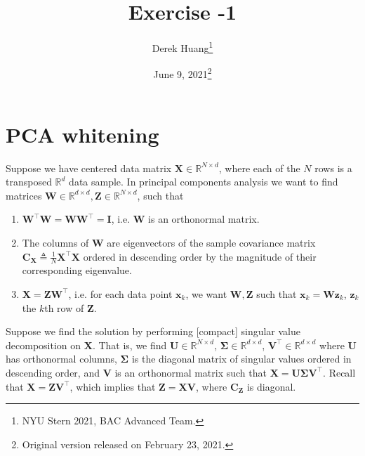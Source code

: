 \documentclass{article}
\title{Exercise -1}
\author{Derek Huang\thanks{NYU Stern 2021, BAC Advanced Team.}}
\date{June 9, 2021\thanks{Original version released on February 23, 2021.}}
\numberwithin{equation}{section}
\begin{document}
\maketitle
\thispagestyle{fancy}

\vspace{-20 pt}

\section{PCA whitening}

Suppose we have centered data matrix $ \mathbf{X} \in
\mathbb{R}^{N \times d} $, where each of the $ N $ rows is a transposed
$ \mathbb{R}^d $ data sample. In principal components analysis we want to find
matrices $ \mathbf{W} \in \mathbb{R}^{d \times d},
\mathbf{Z} \in \mathbb{R}^{N \times d} $, such that
\begin{enumerate}
    \item
    $ \mathbf{W}^\top\mathbf{W} = \mathbf{WW}^\top = \mathbf{I} $, i.e.
    $ \mathbf{W} $ is an orthonormal matrix.

    \item
    The columns of $ \mathbf{W} $ are eigenvectors of the sample covariance
    matrix $ \mathbf{C}_\mathbf{X} \triangleq \frac{1}{N}
    \mathbf{X}^\top\mathbf{X} $ ordered in descending order by the magnitude
    of their corresponding eigenvalue.

    \item
    $ \mathbf{X} = \mathbf{ZW}^\top $, i.e. for each data point
    $ \mathbf{x}_k $, we want $ \mathbf{W}, \mathbf{Z} $ such that
    $ \mathbf{x}_k = \mathbf{Wz}_k $, $ \mathbf{z}_k $ the $ k $th row of
    $ \mathbf{Z} $.
\end{enumerate}

Suppose we find the solution by performing [compact] singular value
decomposition on $ \mathbf{X} $. That is, we find $ \mathbf{U} \in
\mathbb{R}^{N \times d} $, $ \mathbf{\Sigma} \in \mathbb{R}^{d \times d} $,
$ \mathbf{V}^\top \in \mathbb{R}^{d \times d} $ where $ \mathbf{U} $ has
orthonormal columns, $ \mathbf{\Sigma} $ is the diagonal matrix of singular
values\footnotemark{} ordered in descending order, and $ \mathbf{V} $ is an orthonormal matrix
such that $ \mathbf{X} = \mathbf{U\Sigma V}^\top $. Recall that
$ \mathbf{X} = \mathbf{ZV}^\top $, which implies that
$ \mathbf{Z} = \mathbf{XV} $, where $ \mathbf{C}_\mathbf{Z} $ is diagonal.
\end{document}
